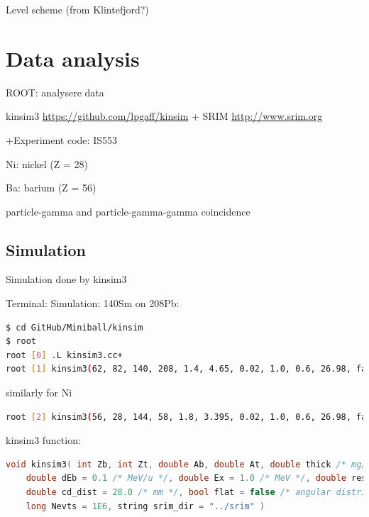 \documentclass[twoside,english]{uiofysmaster/uiofysmaster}
\begin{document}
\bigskip

Level scheme (from Klintefjord?)




\chapter{Data analysis} 

ROOT: analysere data

kinsim3 \url{https://github.com/lpgaff/kinsim} + SRIM \url{http://www.srim.org}

 +Experiment code: IS553

Ni: nickel (Z = 28)

Ba: barium (Z = 56)


\bigskip

particle-gamma and particle-gamma-gamma coincidence

\section{Simulation}
Simulation done by kinsim3


Terminal: Simulation: 140Sm on 208Pb:
\begin{lstlisting}[language=sh]
$ cd GitHub/Miniball/kinsim
$ root
root [0] .L kinsim3.cc+
root [1] kinsim3(62, 82, 140, 208, 1.4, 4.65, 0.02, 1.0, 0.6, 26.98, false, 1e6, "../SRIM")
\end{lstlisting}

similarly for Ni

\begin{lstlisting}[language=sh]
root [2] kinsim3(56, 28, 144, 58, 1.8, 3.395, 0.02, 1.0, 0.6, 26.98, false, 1e6, "../SRIM")
\end{lstlisting}

kinsim3 function:
\begin{lstlisting}[language=c++]
void kinsim3( int Zb, int Zt, double Ab, double At, double thick /* mg/cm^2 */, double Eb /* MeV/u */,
    double dEb = 0.1 /* MeV/u */, double Ex = 1.0 /* MeV */, double res = 0.6 /* % */,
	double cd_dist = 28.0 /* mm */, bool flat = false /* angular distribution? */,
	long Nevts = 1E6, string srim_dir = "../srim" )
\end{lstlisting}
\end{document}
